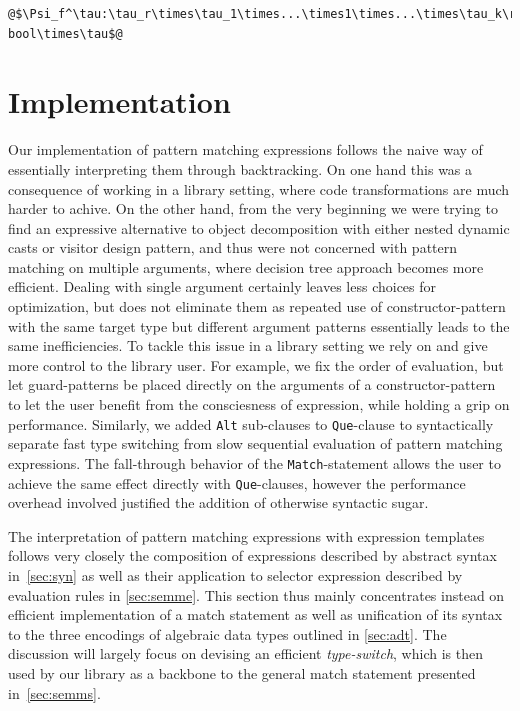 \documentclass[preprint]{sigplanconf}
\makeatletter
\DeclareRobustCommand{\code}[1]{{\lstinline[breaklines=false,escapechar=@]{#1}}}
\makeatother
\begin{document}
\begin{lstlisting}
@$\Psi_f^\tau:\tau_r\times\tau_1\times...\times1\times...\times\tau_k\rightarrow bool\times\tau$@
\end{lstlisting} 

\section{Implementation} %
\label{sec:impl}

Our implementation of pattern matching expressions follows the naive way of 
essentially interpreting them through backtracking. On one hand this was a 
consequence of working in a library setting, where code transformations are much 
harder to achive. On the other hand, from the very beginning we were trying to 
find an expressive alternative to object decomposition with either nested 
dynamic casts or visitor design pattern, and thus were not concerned with 
pattern matching on multiple arguments, where decision tree approach becomes 
more efficient. Dealing with single argument certainly leaves less choices for 
optimization, but does not eliminate them as repeated use of constructor-pattern 
with the same target type but different argument patterns essentially leads to 
the same inefficiencies. To tackle this issue in a library setting we rely on 
and give more control to the library user. For example, we fix the order of 
evaluation, but let guard-patterns be placed directly on the arguments of a 
constructor-pattern to let the user benefit from the consciesness of expression, 
while holding a grip on performance. Similarly, we added \code{Alt} sub-clauses 
to \code{Que}-clause to syntactically separate fast type switching from slow 
sequential evaluation of pattern matching expressions. The fall-through behavior 
of the \code{Match}-statement allows the user to achieve the same effect 
directly with \code{Que}-clauses, however the performance overhead involved 
justified the addition of otherwise syntactic sugar.

The interpretation of pattern matching expressions with expression templates follows 
very closely the composition of expressions described by abstract syntax 
in~\textsection\ref{sec:syn} as well as their application to selector expression 
described by evaluation rules in \textsection\ref{sec:semme}. This section thus
mainly concentrates instead on efficient implementation of a match statement as 
well as unification of its syntax to the three encodings of algebraic data types
outlined in \textsection\ref{sec:adt}. The discussion will largely focus on 
devising an efficient \emph{type-switch}, which is then used by our library as a 
backbone to the general match statement presented in~\textsection\ref{sec:semms}. 
\end{document}
